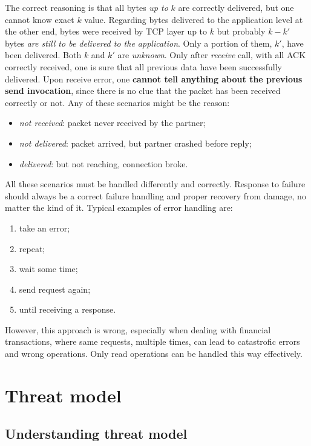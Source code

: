 \documentclass[10pt]{book}
\begin{document}
The correct reasoning is that all bytes \emph{up to} $k$ are correctly
delivered, but one cannot know exact $k$ value. Regarding bytes delivered to
the application level at the other end, bytes were received by TCP layer up to
$k$ but probably $k - k'$ bytes \emph{are still to be delivered to the
application}. Only a portion of them, $k'$, have been delivered. Both $k$ and
$k'$ are \emph{unknown}. Only after \emph{receive} call, with all ACK correctly
received, one is sure that all previous data have been successfully delivered.
Upon receive error, one \textbf{cannot tell anything about the previous send
invocation}, since there is no clue that the packet has been received correctly
or not. Any of these scenarios might be the reason:
\begin{itemize}
    \item \emph{not received}: packet never received by the partner;
    \item \emph{not delivered}: packet arrived, but partner crashed before
        reply;
    \item \emph{delivered}: but not reaching, connection broke.
\end{itemize}

All these scenarios must be handled differently and correctly. Response to
failure should always be a correct failure handling and proper recovery from
damage, no matter the kind of it. Typical examples of error handling are:
\begin{enumerate}
	\item take an error;
    \item repeat;
    \item wait some time;
    \item send request again;
    \item until receiving a response.
\end{enumerate}

However, this approach is wrong, especially when dealing with financial
transactions, where same requests, multiple times, can lead to catastrofic
errors and wrong operations. Only read operations can be handled this way
effectively.



\part{Threat model}

\chapter{Understanding threat model}
\end{document}
